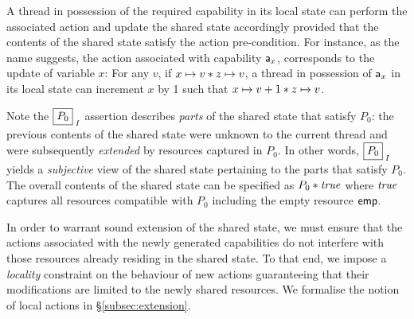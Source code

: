 A thread in possession of the required capability in its local state can perform the associated action and update the shared state accordingly provided that the contents of the shared state satisfy the action pre-condition.
For instance, as the name suggests, the action associated with capability $\mathsf{a}_x$, corresponds to the update of variable $x$: For any $v$, if $x \mapsto v * z \mapsto v$, a thread in possession of $\mathsf{a}_x$ in its local state can increment $x$ by 1 such that $x \mapsto v+1 * z \mapsto v$. 

Note the $\shared{P_0}{I}$ assertion describes \emph{parts} of the shared state that satisfy $P_0$: the previous contents of the shared state were unknown to the current thread and were subsequently \emph{extended} by resources captured in $P_0$. In other words, $\shared{P_0}{I}$ yields a \emph{subjective} view of the shared state pertaining to the parts that satisfy $P_0$. The overall contents of the shared state can be specified as $P_0 * \mathit{true}$ where $\mathit{true}$ captures all resources compatible with $P_0$ including the empty resource $\mathsf{emp}$.

In order to warrant sound extension of the shared state, we must ensure that the actions associated with the newly generated capabilities do not interfere with those resources already residing in the shared state. To that end, we impose a \emph{locality} constraint on the behaviour of new actions guaranteeing that their modifications are limited to the newly shared resources. We formalise the notion of local actions in \S\ref{subsec:extension}.
 
